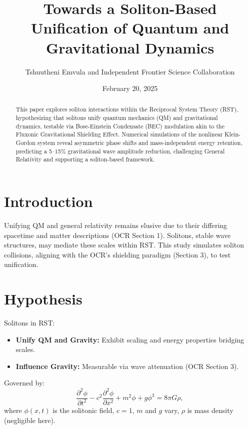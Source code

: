 \documentclass{article}
\title{Towards a Soliton-Based Unification of Quantum and Gravitational Dynamics}
\author{Tshuutheni Emvula and Independent Frontier Science Collaboration}
\date{February 20, 2025}
\begin{document}
\maketitle

\begin{abstract}
This paper explores soliton interactions within the Reciprocal System Theory (RST), hypothesizing that solitons unify quantum mechanics (QM) and gravitational dynamics, testable via Bose-Einstein Condensate (BEC) modulation akin to the Fluxonic Gravitational Shielding Effect. Numerical simulations of the nonlinear Klein-Gordon system reveal asymmetric phase shifts and mass-independent energy retention, predicting a 5–15\% gravitational wave amplitude reduction, challenging General Relativity and supporting a soliton-based framework.
\end{abstract}

\tableofcontents

\section{Introduction}
Unifying QM and general relativity remains elusive due to their differing spacetime and matter descriptions (OCR Section 1). Solitons, stable wave structures, may mediate these scales within RST. This study simulates soliton collisions, aligning with the OCR’s shielding paradigm (Section 3), to test unification.

\section{Hypothesis}
Solitons in RST:
\begin{itemize}
    \item \textbf{Unify QM and Gravity:} Exhibit scaling and energy properties bridging scales.
    \item \textbf{Influence Gravity:} Measurable via wave attenuation (OCR Section 3).
\end{itemize}
Governed by:
\begin{equation}
\frac{\partial^2 \phi}{\partial t^2} - c^2 \frac{\partial^2 \phi}{\partial x^2} + m^2 \phi + g \phi^3 = 8 \pi G \rho,
\end{equation}
where \(\phi(x,t)\) is the solitonic field, \(c = 1\), \(m\) and \(g\) vary, \(\rho\) is mass density (negligible here).
\end{document}
